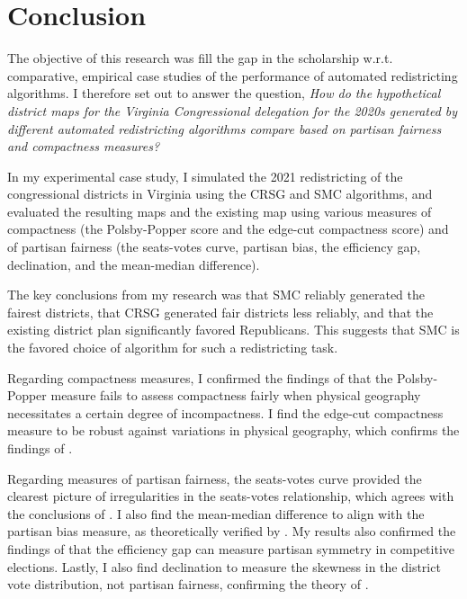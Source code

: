 \section{Conclusion}
\label{sec:conc}

The objective of this research was fill the gap in the scholarship w.r.t. comparative, empirical case studies of the performance of automated redistricting algorithms. I therefore set out to answer the question, \emph{How do the hypothetical district maps for the Virginia Congressional delegation for the 2020s generated by different automated redistricting algorithms compare based on partisan fairness and compactness measures?}

In my experimental case study, I simulated the 2021 redistricting of the congressional districts in Virginia using the CRSG and SMC algorithms, and evaluated the resulting maps and the existing map using various measures of compactness (the Polsby-Popper score and the edge-cut compactness score) and of partisan fairness (the seats-votes curve, partisan bias, the efficiency gap, declination, and the mean-median difference). 

The key conclusions from my research was that SMC reliably generated the fairest districts, that CRSG generated fair districts less reliably, and that the existing district plan significantly favored Republicans. This suggests that SMC is the favored choice of algorithm for such a redistricting task. 

Regarding compactness measures, I confirmed the findings of \textcite{mccartan2020} that the Polsby-Popper measure fails to assess compactness fairly when physical geography necessitates a certain degree of incompactness. I find the edge-cut compactness measure to be robust against variations in physical geography, which confirms the findings of \textcite{dube2016}.

Regarding measures of partisan fairness, the seats-votes curve provided the clearest picture of irregularities in the seats-votes relationship, which agrees with the conclusions of \textcite{katz2020}. I also find the mean-median difference to align with the partisan bias measure, as theoretically verified by \textcite{katz2020}. My results also confirmed the findings of \textcite{veomett2018} that the efficiency gap can measure partisan symmetry in competitive elections. Lastly, I also find declination to measure the skewness in the district vote distribution, not partisan fairness, confirming the theory of \textcite{katz2020}. 

